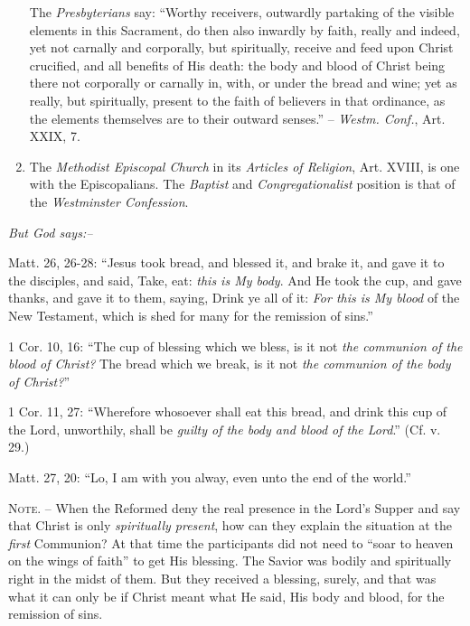 \documentclass[
]{book}
\begin{document}
\begin{enumerate}
  The \emph{Presbyterians} say: ``Worthy receivers, outwardly partaking of the visible elements in this Sacrament, do then also inwardly by faith, really and indeed, yet not carnally and corporally, but spiritually, receive and feed upon Christ crucified, and all benefits of His death: the body and blood of Christ being there not corporally or carnally in, with, or under the bread and wine; yet as really, but spiritually, present to the faith of believers in that ordinance, as the elements themselves are to their outward senses.'' -- \emph{Westm. Conf.}, Art. XXIX, 7.
\item
  The \emph{Methodist Episcopal Church} in its \emph{Articles of Religion}, Art. XVIII, is one with the Episcopalians. The \emph{Baptist} and \emph{Congregationalist} position is that of the \emph{Westminster Confession}.
\end{enumerate}

\begin{center}
\textsl{But God says:--}
\end{center}

Matt. 26, 26-28: ``Jesus took bread, and blessed it, and brake it, and gave it to the disciples, and said, Take, eat: \emph{this is My body}. And He took the cup, and gave thanks, and gave it to them, saying, Drink ye all of it: \emph{For this is My blood} of the New Testament, which is shed for many for the remission of sins.''

1 Cor. 10, 16: ``The cup of blessing which we bless, is it not \emph{the communion of the blood of Christ?} The bread which we break, is it not \emph{the communion of the body of Christ?}''

1 Cor. 11, 27: ``Wherefore whosoever shall eat this bread, and drink this cup of the Lord, unworthily, shall be \emph{guilty of the body and blood of the Lord}.'' (Cf. v. 29.)

Matt. 27, 20: ``Lo, I am with you alway, even unto the end of the world.''

\textsc{Note. --} When the Reformed deny the real presence in the Lord's Supper and say that Christ is only \emph{spiritually present}, how can they explain the situation at the \emph{first} Communion? At that time the participants did not need to ``soar to heaven on the wings of faith'' to get His blessing. The Savior was bodily and spiritually right in the midst of them. But they received a blessing, surely, and that was what it can only be if Christ meant what He said, His body and blood, for the remission of sins.
\end{document}

